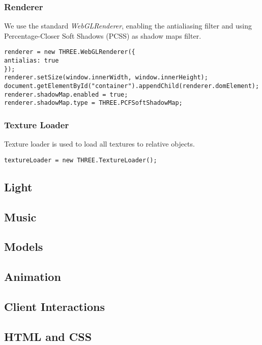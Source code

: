 \documentclass{article}
\begin{document}
\subsubsection{Renderer}
We use the standard \textit{WebGLRenderer}\cite{documentation:threejs}, enabling the antialiasing filter and using Percentage-Closer Soft Shadows (PCSS) as shadow maps filter\cite{PCSS:nvidia}.
\begin{lstlisting}
renderer = new THREE.WebGLRenderer({
antialias: true
});
renderer.setSize(window.innerWidth, window.innerHeight);
document.getElementById("container").appendChild(renderer.domElement);
renderer.shadowMap.enabled = true;
renderer.shadowMap.type = THREE.PCFSoftShadowMap;
\end{lstlisting}
\subsubsection{Texture Loader}
Texture loader\cite{documentation:threejs} is used to load all textures to relative objects.
\begin{lstlisting}
textureLoader = new THREE.TextureLoader();
\end{lstlisting}

\subsection{Light}

\subsection{Music}

\subsection{Models}

\subsection{Animation}

\subsection{Client Interactions}

\subsection{HTML and CSS}
\end{document}
